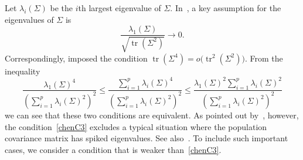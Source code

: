\documentclass[3p]{elsarticle}
\DeclareMathOperator{\mytr}{tr}
\theoremstyle{plain}
\theoremstyle{definition}
\theoremstyle{remark}
\begin{document}

    Let $\lambda_i(\Sigma)$ be the $i$th largest eigenvalue of $\Sigma$.
In~\citet{Bai1996Efiect},
a key assumption for the eigenvalues of $\Sigma$ is
\begin{equation}\label{chenC3}
    \frac{\lambda_{1}(\Sigma)}{\sqrt{\mytr (\Sigma^2)}}\to 0.
\end{equation}
Correspondingly, \citet{Chen2010A} imposed the condition $\mytr (\Sigma^4)=o\big(\mytr ^2(\Sigma^2)\big)$.
    From the inequality
    \begin{equation*}
    \frac{\lambda_1(\Sigma)^4}{(\sum_{i=1}^p \lambda_i(\Sigma)^2)^2}
    \leq
    \frac{\sum_{i=1}^p\lambda_i(\Sigma)^4}{(\sum_{i=1}^p \lambda_i(\Sigma)^2)^2}
    \leq
    \frac{\lambda_1(\Sigma)^2\sum_{i=1}^p\lambda_i(\Sigma)^2}{(\sum_{i=1}^p \lambda_i(\Sigma)^2)^2}
    \end{equation*}
    we can see that these two conditions are equivalent.
As pointed out by~\cite{KATAYAMA2013410}, however, the condition~\eqref{chenC3} excludes a typical situation where the population covariance matrix has spiked eigenvalues.
See also~\cite{MA2015162}.
To include such important cases, we consider a condition that is weaker than~\eqref{chenC3}.
\end{document}
